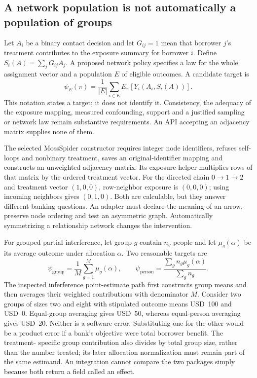 \subsection{A network population is not automatically a population of groups}
Let $A_i$ be a binary contact decision and let $G_{ij}=1$ mean that borrower
$j$'s treatment contributes to the exposure summary for borrower $i$. Define
$S_i(A)=\sum_jG_{ij}A_j$. A proposed network policy specifies a law for the
whole assignment vector and a population $E$ of eligible outcomes. A candidate
target is
\[
 \psi_E(\pi)=\frac{1}{|E|}\sum_{i\in E}E_\pi[Y_i(A_i,S_i(A))].
\]
This notation states a target; it does not identify it. Consistency, the
adequacy of the exposure mapping, measured confounding, support and a justified
sampling or network law remain substantive requirements. An API accepting an
adjacency matrix supplies none of them.

The selected MossSpider constructor requires integer node identifiers, refuses
self-loops and nonbinary treatment, saves an original-identifier mapping and
constructs an unweighted adjacency matrix. Its exposure helper multiplies rows
of that matrix by the ordered treatment vector. For the directed chain
$0\to1\to2$ and treatment vector $(1,0,0)$, row-neighbor exposure is
$(0,0,0)$; using incoming neighbors gives $(0,1,0)$. Both are calculable, but
they answer different banking questions. An adapter must declare the meaning
of an arrow, preserve node ordering and test an asymmetric graph. Automatically
symmetrizing a relationship network changes the intervention.
\citep{exec24_interference_mossspider,exec24_interference_reference}

For grouped partial interference, let group $g$ contain $n_g$ people and let
$\mu_g(\alpha)$ be its average outcome under allocation $\alpha$. Two
reasonable targets are
\[
 \psi_{\mathrm{group}}=\frac1M\sum_{g=1}^M\mu_g(\alpha),
 \qquad
 \psi_{\mathrm{person}}=\frac{\sum_g n_g\mu_g(\alpha)}{\sum_g n_g}.
\]
The inspected inferference point-estimate path first constructs group means
and then averages their weighted contributions with denominator $M$. Consider
two groups of sizes two and eight with stipulated outcome means USD~100 and
USD~0. Equal-group averaging gives USD~50, whereas equal-person averaging gives
USD~20. Neither is a software error. Substituting one for the other would be a
product error if a bank's objective were total borrower benefit. The treatment-
specific group contribution also divides by total group size, rather than the
number treated; its later allocation normalization must remain part of the
same estimand. An integration cannot compare the two packages simply because
both return a field called an effect.
\citep{exec24_interference_inferference,exec24_interference_reference}

